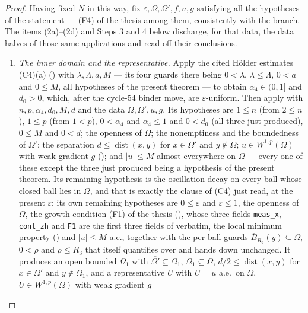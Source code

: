 \begin{proof}
Having fixed $N$ in this way, fix $\varepsilon,\Omega,\Omega',f,u,g$ satisfying
all the hypotheses of the statement --- (F4) of the thesis among them, consistently
with the branch.  The items (2a)--(2d) and Steps 3 and 4 below discharge, for
that data, the data halves of those same applications and read off their
conclusions.
\begin{enumerate}
\item[(2a)] \emph{The inner domain and the representative.}  Apply the
  cited H\"older estimates (C4)(a) () with
  $\lambda,\Lambda,a,M$ --- its four guards there being $0<\lambda$,
  $\lambda\le\Lambda$, $0<a$ and $0\le M$, all hypotheses of the present
  theorem --- to obtain $\alpha_4\in(0,1]$ and $d_0>0$, which,
  after the cycle-54 binder move, are $\varepsilon$-uniform.  Then apply
   with $n,p,\alpha_4,d_0,M,d$ and the data
  $\Omega,\Omega',u,g$.  Its hypotheses are $1\le n$ (from $2\le n$), $1\le p$
  (from $1<p$), $0<\alpha_4$ and $\alpha_4\le1$ and $0<d_0$ (all three just
  produced), $0\le M$ and $0<d$; the openness of $\Omega$; the nonemptiness and
  the boundedness of $\Omega'$; the separation
  $d\le\operatorname{dist}(x,y)$ for $x\in\Omega'$ and $y\notin\Omega$;
  $u\in W^{1,p}(\Omega)$ with weak gradient $g$ (); and
  $|u|\le M$ almost everywhere on $\Omega$ --- every one of these except the
  three just produced being a hypothesis of the present theorem.  Its remaining
  hypothesis is the oscillation decay on every ball whose closed ball lies in
  $\Omega$, and that is exactly the clause of
  (C4) just read, at the present $\varepsilon$; its own remaining hypotheses are
  $0\le\varepsilon$ and $\varepsilon\le1$, the
  openness of $\Omega$, the growth condition (F1) of the thesis
  (), whose three fields
  \texttt{meas\_x}, \texttt{cont\_zh} and \texttt{F1} are the first three fields
  of  verbatim, the local minimum property
  () and $|u|\le M$ a.e., together with the per-ball
  guards $\overline B_{R_3}(y)\subseteq\Omega$, $0<\rho$ and $\rho\le R_3$ that
   itself quantifies over and hands down
  unchanged.  It produces an open bounded
  $\Omega_1$ with $\overline{\Omega'}\subseteq\Omega_1$,
  $\overline{\Omega_1}\subseteq\Omega$, $d/2\le\operatorname{dist}(x,y)$ for
  $x\in\Omega'$ and $y\notin\Omega_1$, and a representative $U$ with $U=u$ a.e.\
  on $\Omega$, $U\in W^{1,p}(\Omega)$ with weak gradient $g$

\end{enumerate}
\end{proof}
